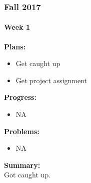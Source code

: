 \subsubsection{Fall 2017}

\paragraph{Week 1}
\begin{adjustwidth}{2.5em}{0pt}
    \vspace{-0.5cm}\textbf{Plans:}
    \vspace{-0.5cm}
    \begin{itemize}
        \item  Get caught up
        \item  Get project assignment
    \end{itemize} 
    \vspace{-0.3cm}\textbf{Progress:}
    \vspace{-0.5cm}
    \begin{itemize}
        \item  NA
    \end{itemize} 
    \vspace{-0.3cm}\textbf{Problems:}
    \vspace{-0.5cm}
    \begin{itemize}
        \item  NA
    \end{itemize}  
    \vspace{-0.3cm}\noindent\textbf{Summary:}\\
    \noindent 
    Got caught up.
\end{adjustwidth}


